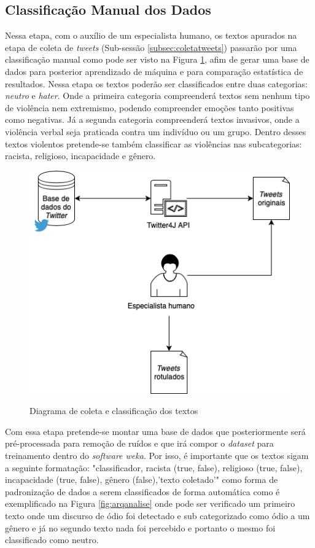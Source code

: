 \subsection{Classificação Manual dos Dados}
\label{subsec:classmanual}
Nessa etapa, com o auxílio de um especialista humano, os textos apurados na etapa de coleta de \textit{tweets} (Sub-sessão \ref{subsec:coletatweets}) passarão por uma classificação manual como pode ser visto na Figura \ref{fig:classificacaotextos}, afim de gerar uma base de dados para posterior aprendizado de máquina e para comparação estatística de resultados. 
Nessa etapa os textos poderão ser classificados entre duas categorias: \textit{neutro} e \textit{hater}. Onde a primeira categoria compreenderá textos sem nenhum tipo de violência nem extremismo, podendo compreender emoções tanto positivas como negativas. Já a segunda categoria compreenderá textos invasivos, onde a violência verbal seja praticada contra um indivíduo ou um grupo. Dentro desses textos violentos pretende-se também classificar as violências nas subcategorias: racista, religioso, incapacidade e gênero.  

\begin{figure}[!h]
\centering 
\caption{Diagrama de coleta e classificação dos textos}
\includegraphics[scale=0.50]{imagens/coletatweets.png}
\label{fig:classificacaotextos}
\end{figure}
\newpage

Com essa etapa pretende-se montar uma base de dados que posteriormente será pré-processada para remoção de ruídos e que irá compor o \textit{dataset} para treinamento dentro do \textit{software weka}. Por isso, é importante que os textos sigam a seguinte formatação: "classificador, racista (true, false), religioso (true, false), incapacidade (true, false), gênero (false),'texto coletado'" como forma de padronização de dados a serem classificados de forma automática como é exemplificado na Figura \ref{fig:arqanalise} onde pode ser verificado um primeiro texto onde um discurso de ódio foi detectado e sub categorizado como ódio a um gênero e já no segundo texto nada foi percebido e portanto o mesmo foi classificado como neutro.

